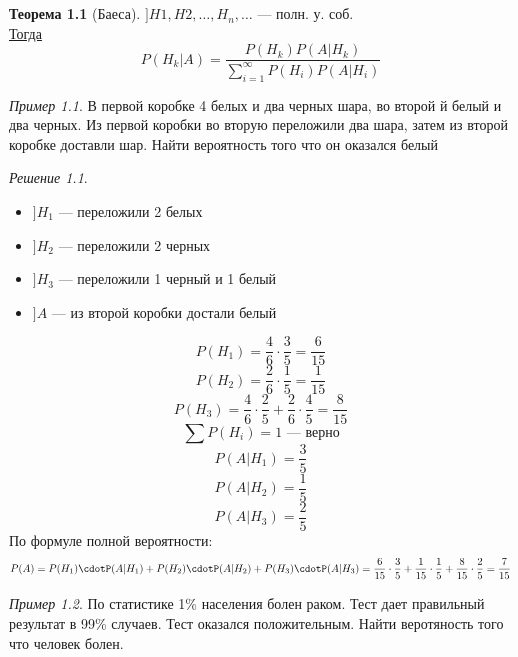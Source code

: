\documentclass[oneside]{book}
\theoremstyle{plain}
\theoremstyle{remark}
\newtheorem*{solution}{Решение}
\newtheorem*{examp}{Пример}
\theoremstyle{definition}
\newtheorem{theorem}{Теорема}[section]
\begin{document}
\chapter{}
\label{sec:org94e78fe}
\begin{theorem}[Баеса]
\(] H1, H2, \dots, H_n ,\dots\) --- полн. у. соб. \\
\uline{Тогда} \[ P(H_k|A) = \frac{P(H_k)P(A|H_k)}{\sum_{i = 1}^{\infty}P(H_i)P(A|H_i)} \]
\end{theorem}
\begin{examp}
В первой коробке 4 белых и два черных шара, во второй й белый и два
черных. Из первой коробки во вторую переложили два шара, затем из
второй коробке доставли шар. Найти вероятность того что он оказался белый
\end{examp}
\begin{solution}
\begin{itemize}
\item \(] H_1\) --- переложили 2 белых
\item \(] H_2\) --- переложили 2 черных
\item \(] H_3\) --- переложили 1 черный и 1 белый
\item \(] A\) --- из второй коробки достали белый
\end{itemize}
\[ P(H_1) = \frac{4}{6}\cdot\frac{3}{5} =  \frac{6}{15} \]
\[ P(H_2) = \frac{2}{6}\cdot\frac{1}{5} = \frac{1}{15} \]
\[ P(H_3) = \frac{4}{6}\cdot\frac{2}{5} + \frac{2}{6}\cdot\frac{4}{5} = \frac{8}{15} \]
\[ \sum P(H_i) = 1\text{ --- верно} \]
\[ P(A|H_1) = \frac{3}{5} \]
\[ P(A|H_2) = \frac{1}{5} \]
\[ P(A|H_3) = \frac{2}{5} \]
По формуле полной вероятности:
\[ P(A) = P(H_1)\cdotP(A|H_1) + P(H_2)\cdotP(A|H_2) + P(H_3)\cdotP(A|H_3) = \frac{6}{15}\cdot\frac{3}{5} + \frac{1}{15}\cdot\frac{1}{5} + \frac{8}{15}\cdot\frac{2}{5} = \frac{7}{15}\]
\end{solution}
\begin{examp}
По статистике 1\% населения болен раком. Тест дает правильный результат
в 99\% случаев. Тест оказался положительным. Найти веротяность того что
человек болен.
\end{examp}
\end{document}
